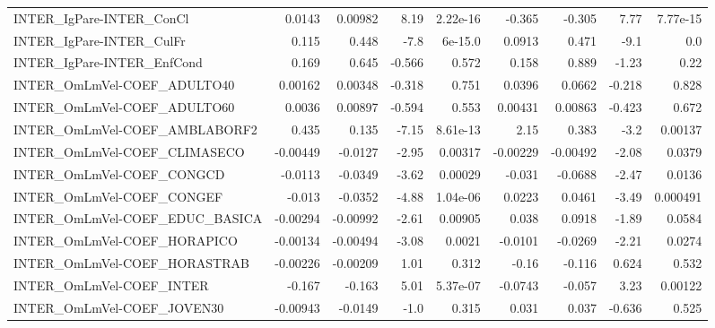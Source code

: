 \begin{tabular}{lrrrrrrrr}
INTER\_IgPare-INTER\_ConCl              &      0.0143 &      0.00982 &     8.19 & 2.22e-16 &     -0.365 &      -0.305 &         7.77 &      7.77e-15 \\
INTER\_IgPare-INTER\_CulFr              &       0.115 &        0.448 &     -7.8 &  6e-15.0 &     0.0913 &       0.471 &         -9.1 &           0.0 \\
INTER\_IgPare-INTER\_EnfCond            &       0.169 &        0.645 &   -0.566 &    0.572 &      0.158 &       0.889 &        -1.23 &          0.22 \\
INTER\_OmLmVel-COEF\_ADULTO40           &     0.00162 &      0.00348 &   -0.318 &    0.751 &     0.0396 &      0.0662 &       -0.218 &         0.828 \\
INTER\_OmLmVel-COEF\_ADULTO60           &      0.0036 &      0.00897 &   -0.594 &    0.553 &    0.00431 &     0.00863 &       -0.423 &         0.672 \\
INTER\_OmLmVel-COEF\_AMBLABORF2         &       0.435 &        0.135 &    -7.15 & 8.61e-13 &       2.15 &       0.383 &         -3.2 &       0.00137 \\
INTER\_OmLmVel-COEF\_CLIMASECO          &    -0.00449 &      -0.0127 &    -2.95 &  0.00317 &   -0.00229 &    -0.00492 &        -2.08 &        0.0379 \\
INTER\_OmLmVel-COEF\_CONGCD             &     -0.0113 &      -0.0349 &    -3.62 &  0.00029 &     -0.031 &     -0.0688 &        -2.47 &        0.0136 \\
INTER\_OmLmVel-COEF\_CONGEF             &      -0.013 &      -0.0352 &    -4.88 & 1.04e-06 &     0.0223 &      0.0461 &        -3.49 &      0.000491 \\
INTER\_OmLmVel-COEF\_EDUC\_BASICA        &    -0.00294 &     -0.00992 &    -2.61 &  0.00905 &      0.038 &      0.0918 &        -1.89 &        0.0584 \\
INTER\_OmLmVel-COEF\_HORAPICO           &    -0.00134 &     -0.00494 &    -3.08 &   0.0021 &    -0.0101 &     -0.0269 &        -2.21 &        0.0274 \\
INTER\_OmLmVel-COEF\_HORASTRAB          &    -0.00226 &     -0.00209 &     1.01 &    0.312 &      -0.16 &      -0.116 &        0.624 &         0.532 \\
INTER\_OmLmVel-COEF\_INTER              &      -0.167 &       -0.163 &     5.01 & 5.37e-07 &    -0.0743 &      -0.057 &         3.23 &       0.00122 \\
INTER\_OmLmVel-COEF\_JOVEN30            &    -0.00943 &      -0.0149 &     -1.0 &    0.315 &      0.031 &       0.037 &       -0.636 &         0.525 \\

\end{tabular}
